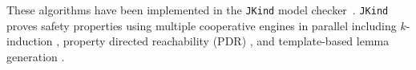 %
%
%
These algorithms have been implemented in the \texttt{JKind} model checker~\cite{jkind,NFM2012:CoGaMiWhLaLu,Spear}. %
\texttt{JKind} proves safety properties using multiple cooperative engines in parallel including $k$-induction \cite{SheeranSS00}, property directed reachability (PDR) \cite{Een2011:PDR}, and template-based lemma generation \cite{Kahsai2011}. %

